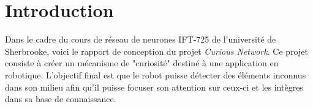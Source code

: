\section{Introduction}
    Dans le cadre du cours de réseau de neurones IFT-725 de l'université de Sherbrooke, voici le rapport de conception du projet \textit{Curious Network}. Ce projet consiste à créer un mécanisme de "curiosité" destiné à une application en robotique. L'objectif final est que le robot puisse détecter des éléments inconnus dans son milieu afin qu'il puisse focuser son attention sur ceux-ci et les intègres dans sa base de connaissance.

